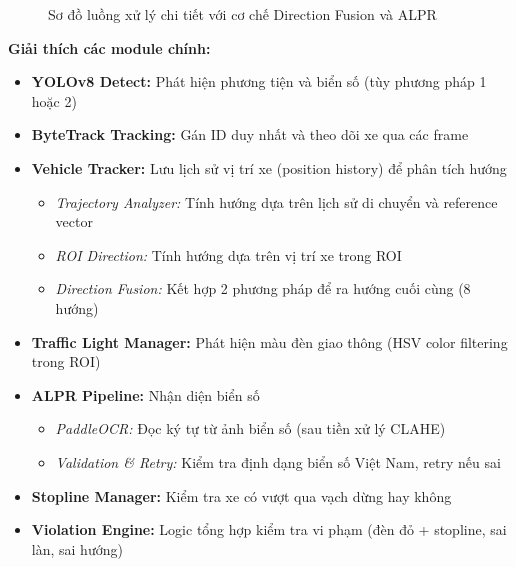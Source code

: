 \begin{figure}[!htbp]
\caption{Sơ đồ luồng xử lý chi tiết với cơ chế Direction Fusion và ALPR}
\label{fig:system_pipeline}
\end{figure}

\textbf{Giải thích các module chính:}
\begin{itemize}
    \item \textbf{YOLOv8 Detect:} Phát hiện phương tiện và biển số (tùy phương pháp 1 hoặc 2)
    \item \textbf{ByteTrack Tracking:} Gán ID duy nhất và theo dõi xe qua các frame
    \item \textbf{Vehicle Tracker:} Lưu lịch sử vị trí xe (position history) để phân tích hướng
    \begin{itemize}
        \item \textit{Trajectory Analyzer:} Tính hướng dựa trên lịch sử di chuyển và reference vector
        \item \textit{ROI Direction:} Tính hướng dựa trên vị trí xe trong ROI
        \item \textit{Direction Fusion:} Kết hợp 2 phương pháp để ra hướng cuối cùng (8 hướng)
    \end{itemize}
    \item \textbf{Traffic Light Manager:} Phát hiện màu đèn giao thông (HSV color filtering trong ROI)
    \item \textbf{ALPR Pipeline:} Nhận diện biển số
    \begin{itemize}
        \item \textit{PaddleOCR:} Đọc ký tự từ ảnh biển số (sau tiền xử lý CLAHE)
        \item \textit{Validation \& Retry:} Kiểm tra định dạng biển số Việt Nam, retry nếu sai
    \end{itemize}
    \item \textbf{Stopline Manager:} Kiểm tra xe có vượt qua vạch dừng hay không
    \item \textbf{Violation Engine:} Logic tổng hợp kiểm tra vi phạm (đèn đỏ + stopline, sai làn, sai hướng)
\end{itemize}

